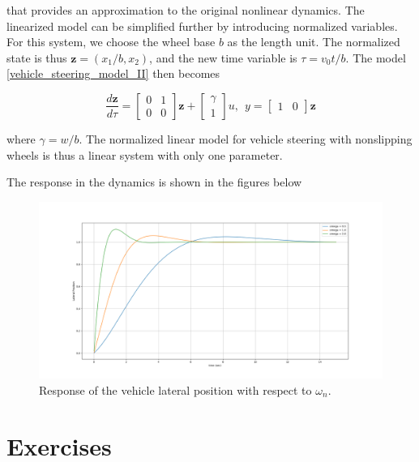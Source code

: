 that provides an approximation to the original nonlinear dynamics.
The linearized model can be simplified further by introducing normalized variables. For this system, we choose the wheel base $b$ as the length unit.  The normalized state is thus $\mathbf{z} = (x_1/b, x_2 )$, 
and the new time variable is $\tau = v_0t/b$.
The model \ref{vehicle_steering_model_II} then becomes

\begin{equation}
\frac{d\mathbf{z}}{d\tau} = 
\begin{bmatrix}
   0 & 1 \\
   0 & 0
\end{bmatrix}\mathbf{z}+
\begin{bmatrix}
   \gamma \\
   1
\end{bmatrix}u,  ~~ y= 
\begin{bmatrix}
   1 & 0
\end{bmatrix}\mathbf{z}
\label{vehicle_steering_model_3}
\end{equation}
 
where $\gamma = w/b$. The  normalized  linear model for  vehicle  steering  with nonslipping wheels is thus a linear system with only one parameter.

The response in the dynamics is shown in the figures below

\begin{figure}[!htb]
\begin{center}
\includegraphics[scale=0.280]{img/state_feedback/lateral_position_response.png}
\end{center}
\caption{Response of the vehicle lateral position with respect to $\omega_n$.}
\label{lateral_position_response}
\end{figure}

\section{Exercises}

